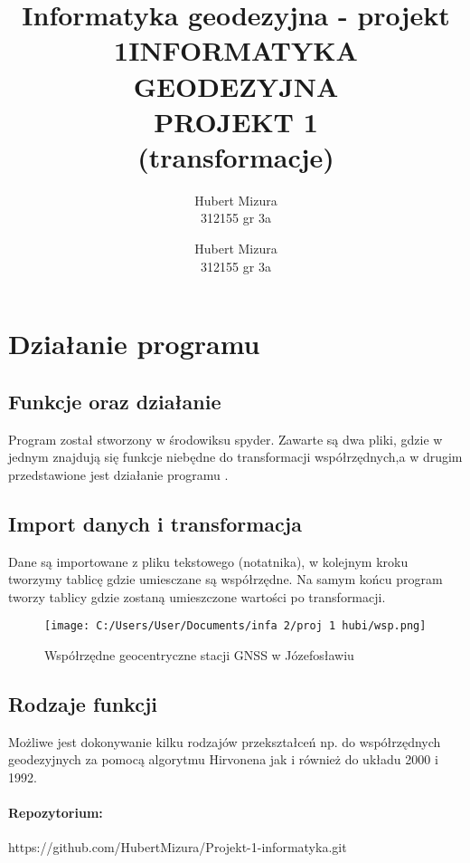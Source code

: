 \documentclass[a4paper,11pt]{article}
\title{Informatyka geodezyjna - projekt 1}
\author{ Hubert Mizura\\
	312155 gr 3a}
\begin{document}
	\title{INFORMATYKA GEODEZYJNA \\ 
		
		PROJEKT 1 \\
		
		(transformacje)}
	
	\author{ Hubert Mizura\\
		312155 gr 3a}
	\maketitle
	\newpage
	\section{Działanie programu}
	\subsection{Funkcje oraz działanie}
	Program został stworzony w środowiksu spyder. Zawarte są dwa pliki, gdzie w jednym znajdują się funkcje niebędne do transformacji współrzędnych,a w drugim przedstawione jest działanie programu .
	\subsection{Import danych i transformacja}
	Dane są importowane z pliku tekstowego (notatnika), w kolejnym kroku tworzymy tablicę gdzie umiesczane są współrzędne. Na samym końcu program tworzy tablicy gdzie zostaną umieszczone wartości po transformacji.
	\begin{figure}
		\centering
		\texttt{[image: C:/Users/User/Documents/infa 2/proj 1 hubi/wsp.png]}
		\caption{Współrzędne geocentryczne stacji GNSS w Józefosławiu}\label{fig:1}
	\end{figure}
	\subsection{Rodzaje funkcji}
	Możliwe jest dokonywanie kilku rodzajów przekształceń np. do współrzędnych geodezyjnych za pomocą algorytmu Hirvonena jak i również do układu 2000 i 1992.
	\newpage

	
	
	\tableofcontents	%
		\paragraph{Repozytorium:}
	https://github.com/HubertMizura/Projekt-1-informatyka.git
\end{document}
